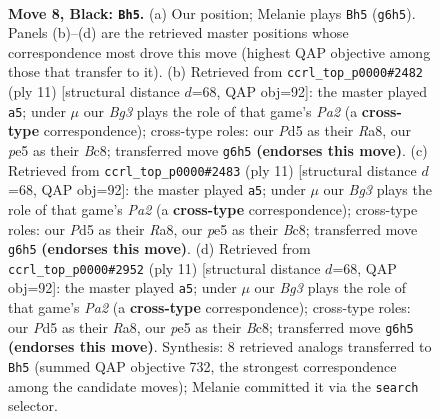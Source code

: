 \documentclass[11pt]{article}
\begin{document}
\begin{figure}[p]\centering
\begin{subfigure}{0.46\textwidth}\centering
\resizebox{\linewidth}{!}{%
\newchessgame
\chessboard[
  setfen={rn2kbnr/pp3ppp/1q2p1b1/2ppP3/3P3P/1P2BN2/P1P1BPP1/RN1QK2R b KQkq - 0 8},
  showmover=false,
  pgfstyle=straightmove, color=movearrow, markmove={g6-h5}
]}
\caption{}
\end{subfigure}\hfill
\begin{subfigure}{0.46\textwidth}\centering
\resizebox{\linewidth}{!}{%
\newchessgame
\chessboard[
  setfen={r1b1kbnr/pp3ppp/1qn1p3/2ppP3/3P4/P1P2N2/1P3PPP/RNBQKB1R b KQkq - 0 6},
  showmover=false,
  pgfstyle=straightmove, color=movearrow, markmove={a7-a5}
]}
\caption{}
\end{subfigure}
\\[4pt]
\begin{subfigure}{0.46\textwidth}\centering
\resizebox{\linewidth}{!}{%
\newchessgame
\chessboard[
  setfen={r1b1kbnr/pp3ppp/1qn1p3/2ppP3/3P4/P1P2N2/1P3PPP/RNBQKB1R b KQkq - 0 6},
  showmover=false,
  pgfstyle=straightmove, color=movearrow, markmove={a7-a5}
]}
\caption{}
\end{subfigure}\hfill
\begin{subfigure}{0.46\textwidth}\centering
\resizebox{\linewidth}{!}{%
\newchessgame
\chessboard[
  setfen={r1b1kbnr/pp3ppp/1qn1p3/2ppP3/3P4/P1P2N2/1P3PPP/RNBQKB1R b KQkq - 0 6},
  showmover=false,
  pgfstyle=straightmove, color=movearrow, markmove={a7-a5}
]}
\caption{}
\end{subfigure}
\caption{\textbf{Move 8, Black: \texttt{Bh5}.} (a) Our position; Melanie plays \texttt{Bh5} (\texttt{g6h5}). Panels (b)--(d) are the retrieved master positions whose correspondence most drove this move (highest QAP objective among those that transfer to it). (b) Retrieved from \texttt{ccrl\_top\_p0000\#2482} (ply 11) [structural distance $d$=68, QAP obj=92]: the master played \texttt{a5}; under $\mu$ our \emph{Bg3} plays the role of that game's \emph{Pa2} (a \textbf{cross-type} correspondence); cross-type roles: our \emph{P}d5 as their \emph{R}a8, our \emph{p}e5 as their \emph{B}c8; transferred move \texttt{g6h5} \textbf{(endorses this move)}. (c) Retrieved from \texttt{ccrl\_top\_p0000\#2483} (ply 11) [structural distance $d$=68, QAP obj=92]: the master played \texttt{a5}; under $\mu$ our \emph{Bg3} plays the role of that game's \emph{Pa2} (a \textbf{cross-type} correspondence); cross-type roles: our \emph{P}d5 as their \emph{R}a8, our \emph{p}e5 as their \emph{B}c8; transferred move \texttt{g6h5} \textbf{(endorses this move)}. (d) Retrieved from \texttt{ccrl\_top\_p0000\#2952} (ply 11) [structural distance $d$=68, QAP obj=92]: the master played \texttt{a5}; under $\mu$ our \emph{Bg3} plays the role of that game's \emph{Pa2} (a \textbf{cross-type} correspondence); cross-type roles: our \emph{P}d5 as their \emph{R}a8, our \emph{p}e5 as their \emph{B}c8; transferred move \texttt{g6h5} \textbf{(endorses this move)}. Synthesis: 8 retrieved analogs transferred to \texttt{Bh5} (summed QAP objective 732, the strongest correspondence among the candidate moves); Melanie committed it via the \texttt{search} selector.}
\label{fig:thought-m15}
\end{figure}
\end{document}
